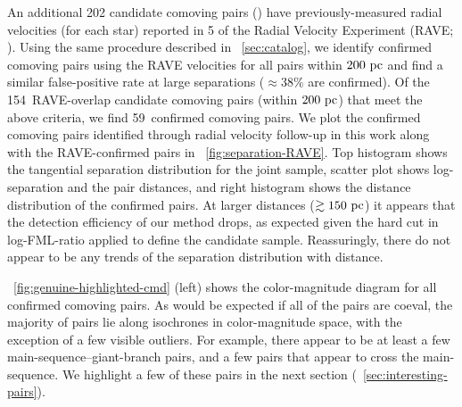\documentclass[modern, letterpaper]{aastex61}
\newcommand{\DR}[1]{\acronym{DR}#1}
\newcommand{\nraveoverlap}{154}
\newcommand{\nravecomoving}{59}
\begin{document}
An additional 202 candidate comoving pairs (\citealt{Oh:2017}) have
previously-measured radial velocities (for each star) reported in \DR{5} of the
Radial Velocity Experiment (RAVE; \citealt{Kunder:2017}).
Using the same procedure described in \sectionname~\ref{sec:catalog}, we
identify confirmed comoving pairs using the RAVE velocities for all pairs within
$200~\mathrm{pc}$ and find a similar false-positive rate at large separations ($\approx
38\%$ are confirmed).
Of the \nraveoverlap\ RAVE-overlap candidate comoving pairs (within $200~\mathrm{pc}$)
that meet the above criteria, we find \nravecomoving\ confirmed comoving pairs.
We plot the confirmed comoving pairs identified through radial velocity
follow-up in this work along with the RAVE-confirmed pairs in
\figurename~\ref{fig:separation-RAVE}.
Top histogram shows the tangential separation distribution for the joint
sample, scatter plot shows log-separation and the pair distances, and right
histogram shows the distance distribution of the confirmed pairs.
At larger distances ($\gtrsim 150~\mathrm{pc}$) it appears that the detection efficiency
of our method drops, as expected given the hard cut in log-FML-ratio applied to
define the candidate sample.
Reassuringly, there do not appear to be any trends of the separation
distribution with distance.

\figurename~\ref{fig:genuine-highlighted-cmd} (left) shows the color-magnitude
diagram for all confirmed comoving pairs.
As would be expected if all of the pairs are coeval, the majority of pairs lie
along isochrones in color-magnitude space, with the exception of a few visible
outliers.
For example, there appear to be at least a few main-sequence--giant-branch
pairs, and a few pairs that appear to cross the main-sequence.
We highlight a few of these pairs in the next section
(\sectionname~\ref{sec:interesting-pairs}).

\clearpage
\end{document}
